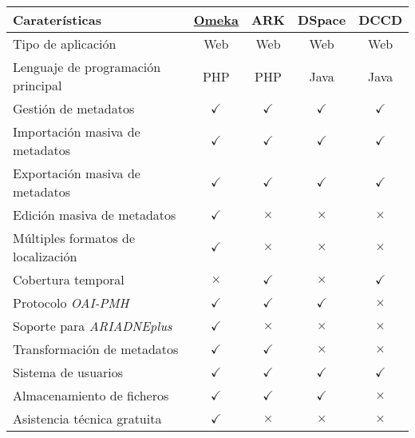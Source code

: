 \begin{table}[H]\label{tabla:comparativa}
\centering
\begin{tabular}{@{}lcccc@{}}
\toprule
Caraterísticas & \underline{Omeka} & ARK & DSpace & DCCD \tabularnewline
\midrule
Tipo de aplicación & Web & Web & Web & Web\tabularnewline
Lenguaje de programación principal & PHP & PHP & Java &
Java\tabularnewline
Gestión de metadatos & \cellcolor{green!25} {$\checkmark$} & \cellcolor{green!25} {$\checkmark$} & \cellcolor{green!25} {$\checkmark$} & \cellcolor{green!25} {$\checkmark$}\tabularnewline
Importación masiva de metadatos & \cellcolor{green!25} {$\checkmark$} & \cellcolor{green!25} {$\checkmark$} & \cellcolor{green!25} {$\checkmark$} & \cellcolor{green!25} {$\checkmark$}\tabularnewline
Exportación masiva de metadatos & \cellcolor{green!25} {$\checkmark$} & \cellcolor{green!25} {$\checkmark$} & \cellcolor{green!25} {$\checkmark$} & \cellcolor{green!25} {$\checkmark$}\tabularnewline
Edición masiva de metadatos & \cellcolor{green!25} {$\checkmark$} & \cellcolor{red!25} {$\times$} & \cellcolor{red!25} {$\times$} & \cellcolor{red!25} {$\times$}\tabularnewline
Múltiples formatos de localización & \cellcolor{green!25} {$\checkmark$} & \cellcolor{red!25} {$\times$} & \cellcolor{red!25} {$\times$} &\cellcolor{red!25} {$\times$}\tabularnewline
Cobertura temporal & \cellcolor{red!25} {$\times$} & \cellcolor{green!25} {$\checkmark$} & \cellcolor{red!25} {$\times$} & \cellcolor{green!25} {$\checkmark$}\tabularnewline
Protocolo \emph{OAI-PMH} & \cellcolor{green!25} {$\checkmark$} & \cellcolor{green!25} {$\checkmark$} & \cellcolor{green!25} {$\checkmark$} & \cellcolor{red!25} {$\times$}\tabularnewline
Soporte para \emph{ARIADNEplus} & \cellcolor{green!25} {$\checkmark$} & \cellcolor{red!25} {$\times$} & \cellcolor{red!25} {$\times$} &
\cellcolor{red!25} {$\times$}\tabularnewline
Transformación de metadatos & \cellcolor{green!25} {$\checkmark$} & \cellcolor{green!25} {$\checkmark$} & \cellcolor{red!25} {$\times$} &
\cellcolor{red!25} {$\times$}\tabularnewline
Sistema de usuarios & \cellcolor{green!25} {$\checkmark$} & \cellcolor{green!25} {$\checkmark$} & \cellcolor{green!25} {$\checkmark$} & \cellcolor{green!25} {$\checkmark$}\tabularnewline
Almacenamiento de ficheros & \cellcolor{green!25} {$\checkmark$} & \cellcolor{green!25} {$\checkmark$} & \cellcolor{green!25} {$\checkmark$} & \cellcolor{red!25} {$\times$}\tabularnewline
Asistencia técnica gratuita & \cellcolor{green!25} {$\checkmark$} & \cellcolor{red!25} {$\times$} & \cellcolor{red!25} {$\times$} & \cellcolor{red!25} {$\times$}\tabularnewline

\end{tabular}
\end{table}

